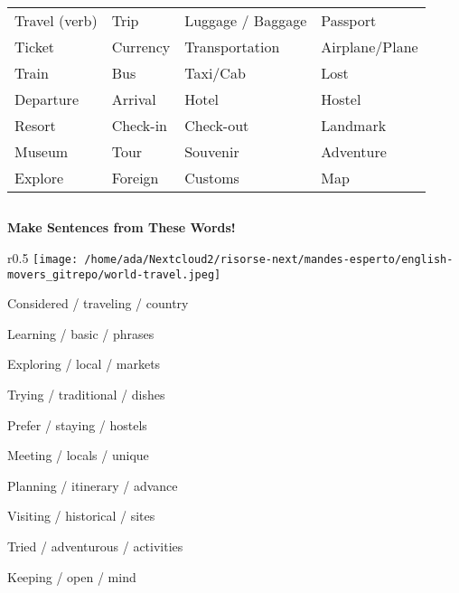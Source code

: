 \documentclass[]{article} %
\begin{document}
\begin{minipage}[h]{0.7\textwidth}
	\begin{center}
		
		\begin{tabular}{ p{3.5cm} p{3.5cm} p{3.5cm} p{3.5cm}}
			
			
			
			Travel (verb)
			& Trip
			& Luggage / Baggage
			& Passport
			\vfil	\\ Ticket
			& Currency
			& Transportation
			
			
			& Airplane/Plane
			\\ Train
			& Bus
			& Taxi/Cab & Lost
			\vfil	\\ Departure
			& Arrival
			
			
			& Hotel
			& Hostel
			\\ Resort
			& Check-in
			& Check-out
			
			
			& Landmark
			\\ Museum
			& Tour
			& Souvenir
			
			& Adventure
			\\ Explore
			& Foreign
			& Customs
			& Map \\
		
			
			
		\end{tabular}
		
	\end{center}
	
\end{minipage}

\subsection*{}
\begin{question}
	\textbf{Make Sentences from These Words!}
\end{question}

\begin{wrapfigure}{r}{0.5\textwidth}
	\raggedleft
\texttt{[image: /home/ada/Nextcloud2/risorse-next/mandes-esperto/english-movers\_gitrepo/world-travel.jpeg]}

\end{wrapfigure}


Considered / traveling / country \par
Learning / basic / phrases \par
Exploring / local / markets \par
Trying / traditional / dishes \par
Prefer / staying / hostels \par
Meeting / locals / unique \par
Planning / itinerary / advance \par
Visiting / historical / sites \par
Tried / adventurous / activities \par
Keeping / open / mind \par
\end{document}
